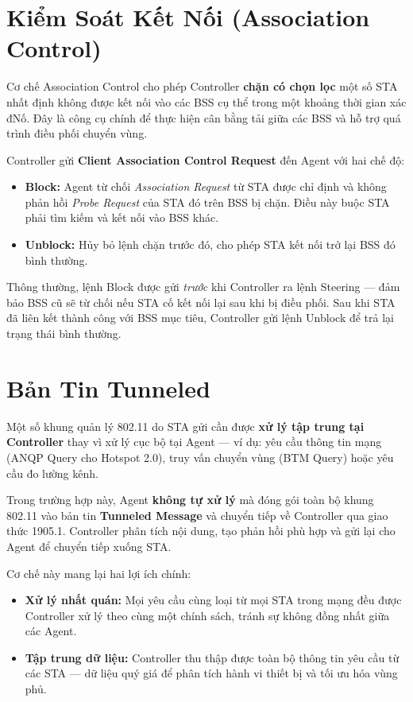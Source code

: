 \section{Kiểm Soát Kết Nối (Association Control)}

Cơ chế Association Control cho phép Controller \textbf{chặn có chọn lọc} một số STA
nhất định không được kết nối vào các BSS cụ thể trong một khoảng thời gian xác
đNố. Đây là công cụ chính để thực hiện cân bằng tải giữa các BSS và hỗ trợ
quá trình điều phối chuyển vùng.

Controller gửi \textbf{Client Association Control Request} đến Agent với hai chế độ:
\begin{itemize}
	\item \textbf{Block:} Agent từ chối \textit{Association Request} từ STA được chỉ
	định và không phản hồi \textit{Probe Request} của STA đó trên BSS bị chặn.
	Điều này buộc STA phải tìm kiếm và kết nối vào BSS khác.
	\item \textbf{Unblock:} Hủy bỏ lệnh chặn trước đó, cho phép STA kết nối trở lại
	BSS đó bình thường.
\end{itemize}

Thông thường, lệnh Block được gửi \textit{trước} khi Controller ra lệnh Steering ---
đảm bảo BSS cũ sẽ từ chối nếu STA cố kết nối lại sau khi bị điều phối. Sau khi STA
đã liên kết thành công với BSS mục tiêu, Controller gửi lệnh Unblock để trả lại trạng
thái bình thường.


\section{Bản Tin Tunneled}

Một số khung quản lý 802.11 do STA gửi cần được \textbf{xử lý tập trung tại
	Controller} thay vì xử lý cục bộ tại Agent --- ví dụ: yêu cầu thông tin mạng (ANQP
Query cho Hotspot 2.0), truy vấn chuyển vùng (BTM Query) hoặc yêu cầu đo lường
kênh.

Trong trường hợp này, Agent \textbf{không tự xử lý} mà đóng gói toàn bộ khung 802.11
vào bản tin \textbf{Tunneled Message} và chuyển tiếp về Controller qua giao thức
1905.1. Controller phân tích nội dung, tạo phản hồi phù hợp và gửi lại cho Agent để
chuyển tiếp xuống STA.

Cơ chế này mang lại hai lợi ích chính:
\begin{itemize}
	\item \textbf{Xử lý nhất quán:} Mọi yêu cầu cùng loại từ mọi STA trong mạng đều
	được Controller xử lý theo cùng một chính sách, tránh sự không đồng nhất
	giữa các Agent.
	\item \textbf{Tập trung dữ liệu:} Controller thu thập được toàn bộ thông tin yêu
	cầu từ các STA --- dữ liệu quý giá để phân tích hành vi thiết bị và tối ưu
	hóa vùng phủ.
\end{itemize}


